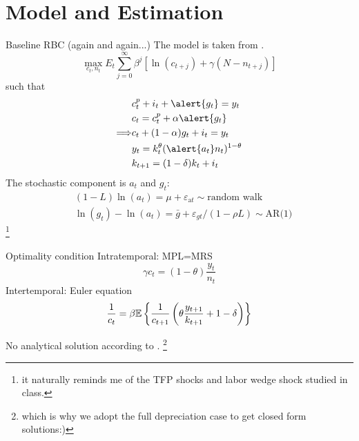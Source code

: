 \documentclass[10pt]{beamer}
\begin{document}
\section{Model and Estimation}

\begin{frame}{Baseline RBC (again and again...)}
    The model is taken from \cite{christiano_eichenbaum_1992}.
    \begin{equation}
        \max_{c_t,n_t} E_{t} \sum_{j=0}^{\infty} \beta^{j} \left[\ln (c_{t+j})+\gamma(N-n_{t+j})\right]
    \end{equation}
    such that
    \begin{align*}
                        & c_t^p + i_t + \alert{g_t} = y_t                 \\
                        & c_t = c_t^p+\alpha \alert{g_t}                  \\
        \Longrightarrow & c_t + (1-\alpha)g_t +i_t=y_t                    \\
                        & y_t = k_t^{\theta} (\alert{a_t} n_t)^{1-\theta} \\
                        & k_{t+1} = (1-\delta) k_t + i_t             
    \end{align*}
    The \alert{stochastic} component is $a_t$ and $g_t$:
    \begin{align}
         & (1-L) \ln \left(a_{t}\right)=\mu+\varepsilon_{\mathrm{a} t}            \sim \text{random walk}        \\
         & \ln \left(g_{t}\right)-\ln \left(a_{t}\right)=\bar{g}+\varepsilon_{g t} /(1-\rho L) \sim \text{AR(1)}
    \end{align}\footnote{it naturally reminds me of the TFP shocks and labor wedge shock studied in class.}
\end{frame}
\begin{frame}{Optimality condition}
    Intratemporal: MPL=MRS
    \begin{equation}
        \gamma c_t = (1-\theta)\frac{y_t}{n_t}
    \end{equation}
    Intertemporal: Euler equation
    \begin{equation}
        \frac{1}{c_t}=\beta \mathbb{E}\left\{\frac{1}{c_{t+1}}\left(\theta\frac{y_{t+1}}{k_{t+1}}+1-\delta\right)\right\}
    \end{equation}

    \alert{No analytical solution} according to \cite{christiano_eichenbaum_1992}. \footnote{which is why we adopt the full depreciation case to get closed form solutions:)}

\end{frame}
\end{document}
